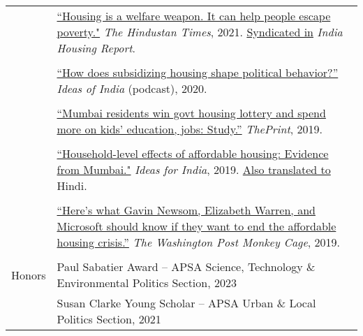 \documentclass[letterpaper, 10.5pt]{article}
\begin{document}
\begin{longtable}{p{1.5in}p{5in}}
& \href{https://www.hindustantimes.com/opinion/housing-is-a-welfare-weapon-it-can-help-people-escape-poverty-101629993983576.html}{``Housing is a welfare weapon. It can help people escape poverty."} \textit{The Hindustan Times}, 2021. \href{https://indiahousingreport.in/outputs/opinion/housing-is-a-welfare-weapon-it-can-help-people-escape-poverty/}{Syndicated in} \textit{India Housing Report}. \\ 
& \\
&   \href{https://www.discoursemagazine.com/politics/2020/12/24/ideas-of-india-how-does-subsidizing-housing-prices-shape-political-behavior}{``How does subsidizing housing shape political behavior?''} \textit{Ideas of India} (podcast), 2020.\\

& \\
& \href{https://theprint.in/opinion/mumbai-residents-win-govt-housing-lottery-and-spend-more-on-kids-education-jobs-study/290485/}{``Mumbai residents win govt housing lottery and spend more on kids' education, jobs: Study.''} \textit{ThePrint}, 2019. \\
& \\
&\href{https://www.ideasforindia.in/topics/poverty-inequality/household-level-effects-of-affordable-housing-evidence-from-mumbai.html}{``Household-level effects of affordable housing: Evidence from Mumbai."} \textit{Ideas for India}, 2019.  \href{https://www.ideasforindia.in/topics/poverty-inequality/household-level-effects-of-affordable-housing-evidence-from-mumbai-hindi.html}{Also translated to} Hindi.\\

& \\

& \href{https://www.washingtonpost.com/news/monkey-cage/wp/2019/01/31/heres-what-gavin-newsom-elizabeth-warren-and-microsoft-should-know-if-want-to-end-the-affordable-housing-crisis/?tid=sm_tw_cage}{``Here's what Gavin Newsom, Elizabeth Warren, and Microsoft should know if they want to end the affordable housing crisis.''} \textit{The Washington Post Monkey Cage}, 2019.\\



&\\




{{Honors}} 
& Paul Sabatier Award -- APSA Science, Technology \& Environmental Politics Section, 2023\\
& Susan Clarke Young Scholar -- APSA Urban \& Local Politics Section, 2021\\


\end{longtable}
\end{document}
